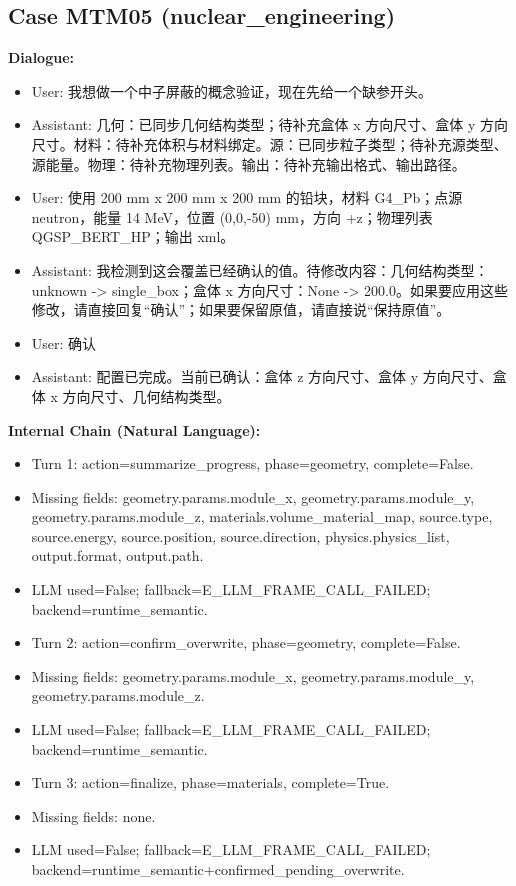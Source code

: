\documentclass[11pt]{ctexart}
\begin{document}
\subsection{Case MTM05 (nuclear\_engineering)}
\textbf{Dialogue:}
\begin{itemize}
\item User: 我想做一个中子屏蔽的概念验证，现在先给一个缺参开头。
\item Assistant: 几何：已同步几何结构类型；待补充盒体 x 方向尺寸、盒体 y 方向尺寸。材料：待补充体积与材料绑定。源：已同步粒子类型；待补充源类型、源能量。物理：待补充物理列表。输出：待补充输出格式、输出路径。
\item User: 使用 200 mm x 200 mm x 200 mm 的铅块，材料 G4\_Pb；点源 neutron，能量 14 MeV，位置 (0,0,-50) mm，方向 +z；物理列表 QGSP\_BERT\_HP；输出 xml。
\item Assistant: 我检测到这会覆盖已经确认的值。待修改内容：几何结构类型：unknown -> single\_box；盒体 x 方向尺寸：None -> 200.0。如果要应用这些修改，请直接回复“确认”；如果要保留原值，请直接说“保持原值”。
\item User: 确认
\item Assistant: 配置已完成。当前已确认：盒体 z 方向尺寸、盒体 y 方向尺寸、盒体 x 方向尺寸、几何结构类型。
\end{itemize}
\textbf{Internal Chain (Natural Language):}
\begin{itemize}
\item Turn 1: action=summarize\_progress, phase=geometry, complete=False.
\item Missing fields: geometry.params.module\_x, geometry.params.module\_y, geometry.params.module\_z, materials.volume\_material\_map, source.type, source.energy, source.position, source.direction, physics.physics\_list, output.format, output.path.
\item LLM used=False; fallback=E\_LLM\_FRAME\_CALL\_FAILED; backend=runtime\_semantic.
\item Turn 2: action=confirm\_overwrite, phase=geometry, complete=False.
\item Missing fields: geometry.params.module\_x, geometry.params.module\_y, geometry.params.module\_z.
\item LLM used=False; fallback=E\_LLM\_FRAME\_CALL\_FAILED; backend=runtime\_semantic.
\item Turn 3: action=finalize, phase=materials, complete=True.
\item Missing fields: none.
\item LLM used=False; fallback=E\_LLM\_FRAME\_CALL\_FAILED; backend=runtime\_semantic+confirmed\_pending\_overwrite.
\end{itemize}
\end{document}
